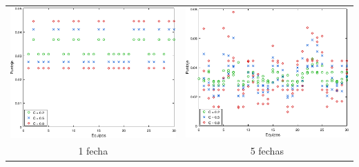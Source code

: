             \noindent{} \begin{minipage}{\textwidth}
                \begin{center}
                    \vspace{1em}

                    \begin{tabular}{cc}
                        \includegraphics{graficos/exp2-partidos-liga-afa1.pdf} & \includegraphics{graficos/exp2-partidos-liga-afa3.pdf} \\
                        {\small 1 fecha}                                       & {\small 5 fechas}
                    \end{tabular}
                \end{center}
            \end{minipage}

